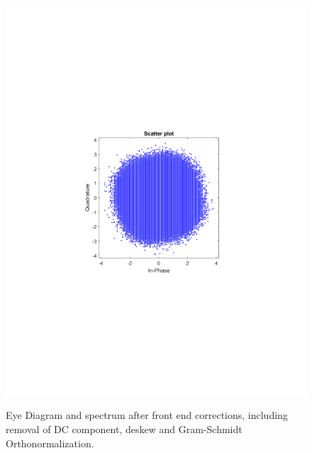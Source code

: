 \begin{refsection}
\begin{figure}[H]
\begin{minipage}{0.30\textwidth}
		\includegraphics[clip, trim=4cm 8cm 4cm 8cm, width=1\textwidth]{./sdf/m_qam_system/figures/expResults/homodyne/1_const_4GBdInSig13dBc_AfFec.pdf}
		\label{fig:4GBdSpecBefFec}
	\end{minipage}
	\caption{Eye Diagram and spectrum after front end corrections, including removal of DC component, deskew and Gram-Schmidt Orthonormalization.}
\end{figure}


\end{refsection}
